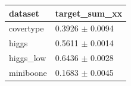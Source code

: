 \begin{tabular}{ll}
\toprule
dataset & target\_sum\_xx \\
\midrule
covertype & 0.3926 $\pm$ 0.0094 \\
higgs & 0.5611 $\pm$ 0.0014 \\
higgs\_low & 0.6436 $\pm$ 0.0028 \\
miniboone & 0.1683 $\pm$ 0.0045 \\
\bottomrule
\end{tabular}
